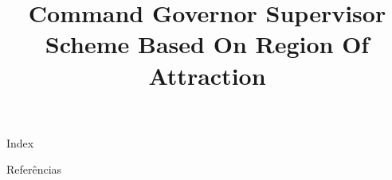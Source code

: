 \documentclass[ieee,english]{slides}
\title{Command Governor Supervisor Scheme Based On Region Of Attraction}
\begin{document}
\maketitle{}

\begin{slide}{Index}
  \begin{minipage}[t][0.6\textheight][t]{0.5\textwidth}
    \tableofcontents[sections={1-3}]
  \end{minipage}
  \begin{minipage}[t][4\baselineskip][t]{0.5\textwidth}
    \tableofcontents[sections={4-}]
  \end{minipage}
  \vfill\null{}
\end{slide}





\begin{frame}[allowframebreaks]{Referências}
  \nocite{*}
  \printbibliography{}
\end{frame}
\end{document}
